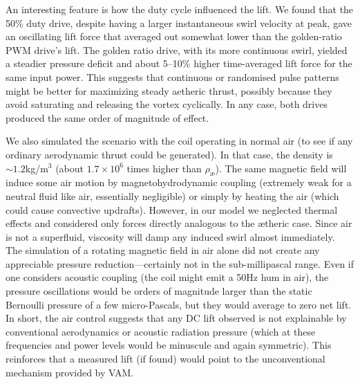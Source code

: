 \documentclass[twocolumn,aps,pre,floatfix,nofootinbib]{revtex4-2}
\begin{document}
An interesting feature is how the duty cycle influenced the lift. We found that the 50\% duty drive, despite having a larger instantaneous swirl velocity at peak, gave an oscillating lift force that averaged out somewhat lower than the golden-ratio PWM drive’s lift. The golden ratio drive, with its more continuous swirl, yielded a steadier pressure deficit and about 5–10\% higher time-averaged lift force for the same input power. This suggests that continuous or randomised pulse patterns might be better for maximizing steady aetheric thrust, possibly because they avoid saturating and releasing the vortex cyclically. In any case, both drives produced the same order of magnitude of effect.


We also simulated the scenario with the coil operating in normal air (to see if any ordinary aerodynamic thrust could be generated). In that case, the density is $\sim 1.2$kg/m$^3$ (about $1.7\times10^6$ times higher than $\rho_{\text{æ}}$). The same magnetic field will induce some air motion by magnetohydrodynamic coupling (extremely weak for a neutral fluid like air, essentially negligible) or simply by heating the air (which could cause convective updrafts). However, in our model we neglected thermal effects and considered only forces directly analogous to the ætheric case. Since air is not a superfluid, viscosity will damp any induced swirl almost immediately. The simulation of a rotating magnetic field in air alone did not create any appreciable pressure reduction—certainly not in the sub-millipascal range. Even if one considers acoustic coupling (the coil might emit a 50Hz hum in air), the pressure oscillations would be orders of magnitude larger than the static Bernoulli pressure of a few micro-Pascals, but they would average to zero net lift. In short, the air control suggests that any DC lift observed is not explainable by conventional aerodynamics or acoustic radiation pressure (which at these frequencies and power levels would be minuscule and again symmetric). This reinforces that a measured lift (if found) would point to the unconventional mechanism provided by VAM.
\end{document}
